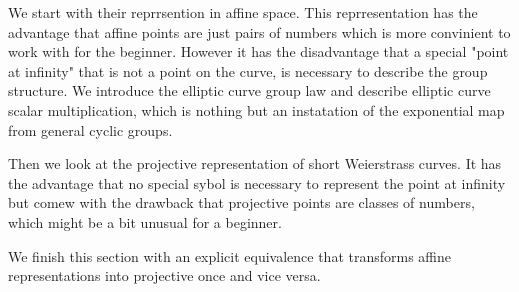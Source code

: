 We start with their reprrsention in affine space. This reprresentation has the advantage that affine points are just pairs of numbers which is more convinient to work with for the beginner. However it has the disadvantage that a special "point at infinity" that is not a point on the curve, is necessary to describe the group structure. We introduce the elliptic curve group law and describe elliptic curve scalar multiplication, which is nothing but an instatation of the exponential map from general cyclic groups.

Then we look at the projective representation of short Weierstrass curves. It has the advantage that no special sybol is necessary to represent the point at infinity but comew with the drawback that projective points are classes of numbers, which might be a bit unusual for a beginner.

We finish this section with an explicit equivalence that transforms affine representations into projective once and vice versa.

